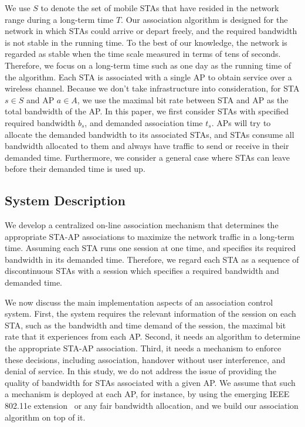 \documentclass[conference]{IEEEtran}
\begin{document}
  We use $S$ to denote the set of mobile STAs that have resided in the network range during a long-term time $T$.  Our association algorithm is designed for the network in which STAs could arrive or depart freely, and the required bandwidth is not stable in the running time. To the best of our knowledge, the network is regarded as stable when the time scale measured in terms of tens of seconds.  Therefore, we focus on a long-term time such as one day as the running time of the algorithm.  Each STA is associated with a single AP to obtain service over a wireless channel.  Because we don't take infrastructure into consideration, for STA $s\in S$ and AP $a\in A$, we use the maximal bit rate between STA and AP as the total bandwidth of the AP.  In this paper, we first consider STAs with specified required bandwidth $b_s$, and demanded association time $t_s$.  APs will try to allocate the demanded bandwidth to its associated STAs, and STAs consume all bandwidth allocated to them and always have traffic to send or receive in their demanded time.  Furthermore, we consider a general case where STAs can leave before their demanded time is used up.

  \subsection{System Description}
  We develop a centralized on-line association mechanism that determines the appropriate STA-AP associations to maximize the network traffic in a long-term time.  Assuming each STA runs one session at one time, and specifies its required bandwidth in its demanded time.  Therefore, we regard each STA as a sequence of discontinuous STAs with a session which specifies a required bandwidth and demanded time.


  We now discuss the main implementation aspects of an association control system. First, the system requires the relevant information of the session on each STA, such as the bandwidth and time demand of the session, the maximal bit rate that it experiences from each AP.  Second, it needs an algorithm to determine the appropriate STA-AP association.  Third, it needs a mechanism to enforce these decisions, including association, handover without user interference, and denial of service.  In this study, we do not address the issue of providing the quality of bandwidth for STAs associated with a given AP.  We assume that such a mechanism is deployed at each AP, for instance, by using the emerging IEEE 802.11e extension~\cite{Ni:2004} or any fair bandwidth allocation, and we build our association algorithm on top of it.
\end{document}
